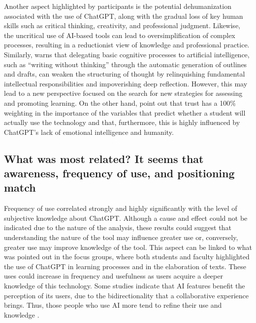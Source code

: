 \documentclass[english]{textolivre}
\begin{document}
Another aspect highlighted by participants is the potential dehumanization associated with the use of ChatGPT, along with the gradual loss of key human skills such as critical thinking, creativity, and professional judgment. Likewise, the uncritical use of AI-based tools can lead to oversimplification of complex processes, resulting in a reductionist view of knowledge and professional practice. Similarly, \textcite{unab2024integridade} warns that delegating basic cognitive processes to artificial intelligence, such as “writing without thinking” through the automatic generation of outlines and drafts, can weaken the structuring of thought by relinquishing fundamental intellectual responsibilities and impoverishing deep reflection. However, this may lead to a new perspective focused on the search for new strategies for assessing and promoting learning. On the other hand, \textcite{marinas2025tam} point out that trust has a 100\% weighting in the importance of the variables that predict whether a student will actually use the technology and that, furthermore, this is highly influenced by ChatGPT’s lack of emotional intelligence and humanity.


\subsection{What was most related? It seems that awareness, frequency of use, and positioning match}\label{sec-resumo}
Frequency of use correlated strongly and highly significantly with the level of subjective knowledge about ChatGPT. Although a cause and effect could not be indicated due to the nature of the analysis, these results could suggest that understanding the nature of the tool may influence greater use or, conversely, greater use may improve knowledge of the tool. This aspect can be linked to what was pointed out in the focus groups, where both students and faculty highlighted the use of ChatGPT in learning processes and in the elaboration of texts. These uses could increase in frequency and usefulness as users acquire a deeper knowledge of this technology. Some studies indicate that AI features benefit the perception of its users, due to the bidirectionality that a collaborative experience brings. Thus, those people who use AI more tend to refine their use and knowledge \cite{li2021smartservice,rezwana2022humanai}.
\end{document}
